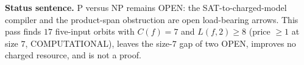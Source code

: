 \documentclass[11pt]{article}
\begin{document}
\bigskip
\noindent\textbf{Status sentence.} P versus NP remains OPEN: the SAT-to-charged-model compiler and the product-span obstruction are open load-bearing arrows. This pass finds $17$ five-input orbits with $C(f)=7$ and $L(f,2)\ge8$ (price $\ge1$ at size $7$, COMPUTATIONAL), leaves the size-$7$ gap of two OPEN, improves no charged resource, and is not a proof.
\end{document}
